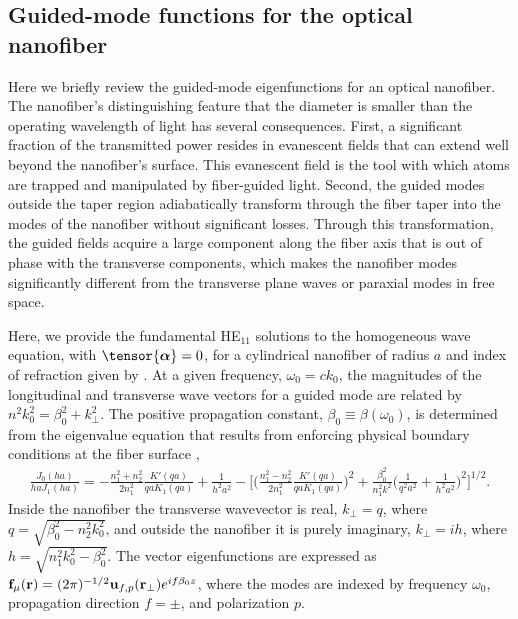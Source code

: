\documentclass[preprint,aps,pra,onecolumn]{revtex4-1} %
\begin{document}
\begin{appendix}	

\section{Guided-mode functions for the optical nanofiber} \label{Appendix::ModeFunctions}

Here we briefly review the guided-mode eigenfunctions for an optical nanofiber.  The nanofiber's distinguishing feature that the diameter is smaller than the operating wavelength of light has several consequences.  First, a significant fraction of the transmitted power resides in evanescent fields that can extend well beyond the nanofiber's surface.  This evanescent field is the tool with which atoms are trapped and manipulated by fiber-guided light.  Second, the guided modes outside the taper region adiabatically transform through the fiber taper into the modes of the nanofiber without significant losses.  Through this transformation, the guided fields acquire a large component along the fiber axis that is out of phase with the transverse components, which makes the nanofiber modes significantly different from the transverse plane waves or paraxial modes in free space.    

Here, we provide the fundamental HE$_{11}$ solutions to the homogeneous wave equation,  with $\tensor{\boldsymbol{\alpha}} = 0$, for a cylindrical nanofiber of radius $a$ and index of refraction given by .  At a given frequency, $\omega_0 = c k_0$, the magnitudes of the longitudinal and transverse wave vectors for a guided mode are related by $n^2 k_0^2 = \beta_0^2 + k_\perp^2$.  The positive propagation constant, $\beta_0 \equiv \beta(\omega_0)$, is determined from the eigenvalue equation that results from enforcing physical boundary conditions at the fiber surface \cite{Yariv, Marcuse, Snyder and Love},
	\begin{align}
		\frac{J_0(ha)}{ha J_1(ha)} = - \frac{n_1^2+n_2^2}{2n_1^2} \frac{K'(qa)}{qa K_1(qa)} + \frac{1}{h^2 a^2} - \bigg[ \bigg(\frac{n_1^2 - n_2^2}{2 n_1^2} \frac{K'(qa)}{qa K_1(qa)} \bigg)^2  + \frac{\beta_0^2}{n^2_1 k^2} \bigg(\frac{1}{q^2a^2} + \frac{1}{h^2a^2} \bigg)^2 \bigg]^{1/2}.
	\end{align}
Inside the nanofiber the transverse wavevector is real, $k_\perp = q$, where $q=\sqrt{\beta_0^2- n_2^2k_0^2}$, and outside the nanofiber it is purely imaginary, $k_\perp = i h$, where $h=\sqrt{n_1^2 k_0^2 - \beta_0^2}$.  The vector eigenfunctions are expressed as $\mathbf{f}_{\mu}(\mathbf{r}) = (2\pi)^{-1/2}\mathbf{u}_{f,p}(\mathbf{r}_\perp) e^{i f \beta_0 z}$, where the modes are indexed by frequency $\omega_0$, propagation direction $f = \pm$, and polarization $p$.


\end{appendix}
\end{document}
